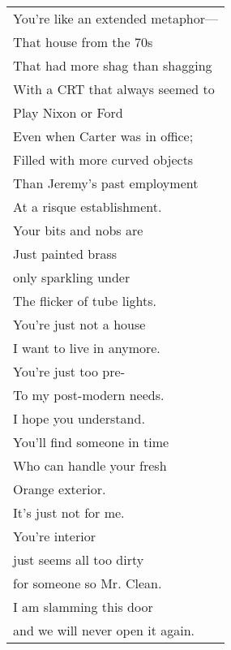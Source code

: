 \documentclass{article}
\begin{document}
\begin{center}
\begin{tabular}{l}
You're like an extended metaphor--- \\
That house from the 70s \\
That had more shag than shagging \\
With a CRT that always seemed to \\
Play Nixon or Ford \\
Even when Carter was in office; \\ %
Filled with more curved objects \\
Than Jeremy's past employment \\
At a risque establishment. \\
Your bits and nobs are \\
Just painted brass \\
only sparkling under \\
The flicker of tube lights. \\
You're just not a house \\
I want to live in anymore. \\
You're just too pre- \\
To my post-modern needs. \\
I hope you understand. \\
You'll find someone in time \\
Who can handle your fresh \\
Orange exterior. \\
It's just not for me. \\
You're interior \\
just seems all too dirty \\
for someone so Mr. Clean. \\
I am slamming this door \\
and we will never open it again. \\
\end{tabular}
\end{center}
\end{document}
